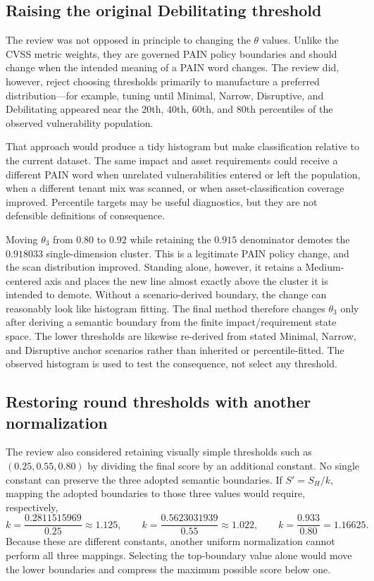 \documentclass[11pt]{article}
\begin{document}
\subsection{Raising the original Debilitating threshold}

The review was not opposed in principle to changing the $\theta$ values. Unlike the
CVSS metric weights, they are governed PAIN policy boundaries and should change when
the intended meaning of a PAIN word changes. The review did, however, reject
choosing thresholds primarily to manufacture a preferred distribution---for example,
tuning until Minimal, Narrow, Disruptive, and Debilitating appeared near the 20th,
40th, 60th, and 80th percentiles of the observed vulnerability population.

That approach would produce a tidy histogram but make classification relative to
the current dataset. The same impact and asset requirements could receive a
different PAIN word when unrelated vulnerabilities entered or left the population,
when a different tenant mix was scanned, or when asset-classification coverage
improved. Percentile targets may be useful diagnostics, but they are not defensible
definitions of consequence.

Moving $\theta_3$ from $0.80$ to $0.92$ while retaining the $0.915$ denominator
demotes the $0.918033$ single-dimension cluster. This is a legitimate PAIN policy
change, and the scan distribution improved. Standing alone, however, it retains a
Medium-centered axis and places the new line almost exactly above the cluster it is
intended to demote. Without a scenario-derived boundary, the change can reasonably
look like histogram fitting. The final method therefore changes $\theta_3$ only
after deriving a semantic boundary from the finite impact/requirement state space.
The lower thresholds are likewise re-derived from stated Minimal, Narrow, and
Disruptive anchor scenarios rather than inherited or percentile-fitted. The observed
histogram is used to test the consequence, not select any threshold.

\subsection{Restoring round thresholds with another normalization}

The review also considered retaining visually simple thresholds such as
$(0.25,0.55,0.80)$ by dividing the final score by an additional constant. No single
constant can preserve the three adopted semantic boundaries. If
$S'=S_H/k$, mapping the adopted boundaries to those three values would require,
respectively,
\[
k=\frac{0.2811515969}{0.25}\approx1.125,\qquad
k=\frac{0.5623031939}{0.55}\approx1.022,\qquad
k=\frac{0.933}{0.80}=1.16625.
\]
Because these are different constants, another uniform normalization cannot
perform all three mappings. Selecting the top-boundary value alone would move the
lower boundaries and compress the maximum possible score below one.
\end{document}
